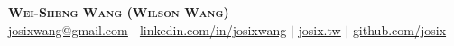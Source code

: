 \documentclass[letterpaper,11pt]{article}
\begin{document}

\begin{center}
    \textbf{\Huge \scshape Wei-Sheng Wang (Wilson Wang)} \\ \vspace{1pt}
    \small \href{mailto:josixwang@gmail.com}{\underline{josixwang@gmail.com}} $|$ 
    \href{https://www.linkedin.com/in/josixwang/}{\underline{linkedin.com/in/josixwang}} $|$
    \href{https://josix.tw}{\underline{josix.tw}} $|$
    \href{https://github.com/josix}{\underline{github.com/josix}}
\end{center}

\end{document}
